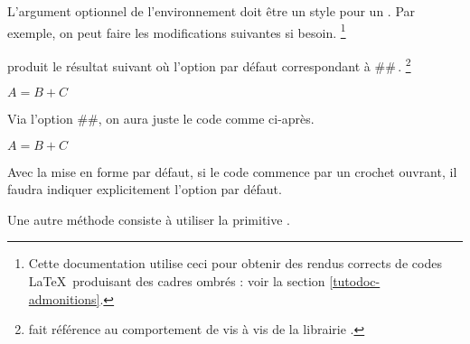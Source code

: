 \documentclass{../main/main}
\begin{document}
\begin{tdocnote}
	L'argument optionnel de l'environnement  doit être un style pour un . Par exemple, on peut faire les modifications suivantes si besoin.%
	\footnote{
		Cette documentation utilise ceci pour obtenir des rendus corrects de codes \LaTeX\ produisant des cadres ombrés : voir la section \ref{tutodoc-admonitions}.
	}

\end{tdocnote}


\begin{tdocexa}[À la suite]
     produit le résultat suivant où l'option par défaut correspondant à \tdoclatexin##\,.
    \footnote{
         fait référence au comportement  de  vis à vis de la librairie .
    }

    \begin{tdoclatex}
        $A = B + C$
    \end{tdoclatex}
\end{tdocexa}


\begin{tdocexa}
    Via l'option \tdoclatexin##, on aura juste le code comme ci-après.

    \begin{tdoclatex}
        $A = B + C$
    \end{tdoclatex}
\end{tdocexa}


\begin{tdocwarn}
    Avec la mise en forme par défaut, si le code commence par un crochet ouvrant, il faudra indiquer explicitement l'option par défaut.

    \smallskip

    Une autre méthode consiste à utiliser la primitive .
\end{tdocwarn}
\end{document}
